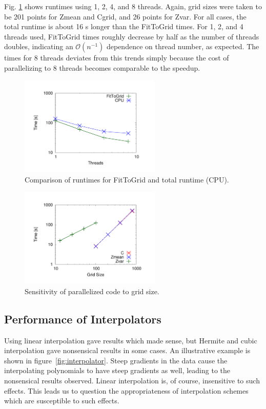 \documentclass[11pt]{article}
\begin{document}
Fig. \ref{fig:fittogrid} shows runtimes using 1, 2, 4, and 8
threads. Again, grid sizes were taken to be 201 points for Zmean and
Cgrid, and 26 points for Zvar. For all cases, the total runtime is
about 16 s longer than the FitToGrid times. For 1, 2, and 4 threads
used, FitToGrid times roughly decrease by half as the number of
threads doubles, indicating an $\mathcal{O}(n^{-1})$ dependence on
thread number, as expected. The times for 8 threads deviates from this
trends simply because the cost of parallelizing to 8 threads becomes
comparable to the speedup.

\begin{figure} [h]
\centering
\includegraphics[width=0.6\textwidth]{plot_threads}
\caption{\label{fig:fittogrid} Comparison of runtimes for FitToGrid
  and total runtime (CPU).}
\end{figure}

\begin{figure} [h]
\centering
\includegraphics[width=0.6\textwidth]{plot_gridsizes}
\caption{\label{fig:gridsensitivity} Sensitivity of parallelized code
  to grid size.}
\end{figure}

\subsection{Performance of Interpolators}
Using linear interpolation gave results which made sense, but Hermite
and cubic interpolation gave nonsensical results in some cases. An
illustrative example is shown in figure~\ref{fig:interpolator}. Steep
gradients in the data cause the interpolating polynomials to have
steep gradients as well, leading to the nonsensical results
observed. Linear interpolation is, of course, insensitive to such
effects. This leads us to question the appropriateness of
interpolation schemes which are susceptible to such effects.
\end{document}
